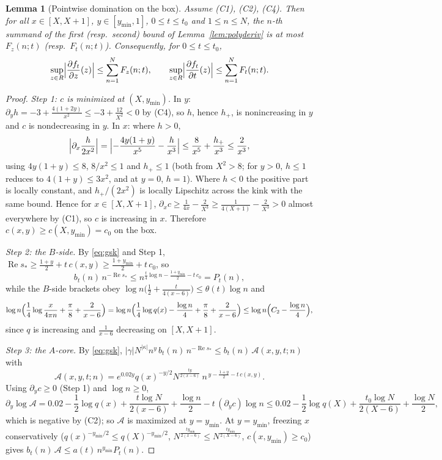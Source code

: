 \documentclass[11pt]{article}
\newtheorem{lemma}[theorem]{Lemma}
\theoremstyle{definition}
\DeclareMathOperator{\Rea}{Re}
\begin{document}
\begin{lemma}[Pointwise domination on the box]\label{lem:dompoint}
Assume (C1), (C2), (C4). Then for all $x\in[X,X+1]$,
$y\in[y_{\min},1]$, $0\le t\le t_0$ and $1\le n\le N$, the $n$-th
summand of the first (resp.\ second) bound of
Lemma~\ref{lem:polyderiv} is at most $F_z(n;t)$ (resp.\
$F_t(n;t)$). Consequently, for $0\le t\le t_0$,
\[
\sup_{z\in R}\Bigl|\frac{\partial f_t}{\partial z}(z)\Bigr|
\le\sum_{n=1}^{N}F_z(n;t),
\qquad
\sup_{z\in R}\Bigl|\frac{\partial f_t}{\partial t}(z)\Bigr|
\le\sum_{n=1}^{N}F_t(n;t).
\]
\end{lemma}

\begin{proof}
\emph{Step 1: $c$ is minimized at $(X,y_{\min})$.} In $y$:
$\partial_yh=-3+\frac{4(1+2y)}{x^2}\le-3+\frac{12}{X^2}<0$ by (C4),
so $h$, hence $h_+$, is nonincreasing in $y$ and $c$ is
nondecreasing in $y$. In $x$: where $h>0$,
\[
\Bigl|\partial_x\frac{h}{2x^2}\Bigr|
=\Bigl|-\frac{4y(1+y)}{x^5}-\frac{h}{x^3}\Bigr|
\le\frac{8}{x^5}+\frac{h_+}{x^3}\le\frac2{x^3},
\]
using $4y(1+y)\le8$, $8/x^2\le1$ and $h_+\le1$ (both from
$X^2>8$; for $y>0$, $h\le1$ reduces to $4(1+y)\le3x^2$, and at
$y=0$, $h=1$). Where $h<0$ the positive part is locally constant,
and $h_+/(2x^2)$ is locally Lipschitz across the kink with the same
bound. Hence for $x\in[X,X+1]$,
$\partial_xc\ge\frac1{4x}-\frac2{X^3}
\ge\frac1{4(X+1)}-\frac2{X^3}>0$ almost everywhere by (C1), so $c$
is increasing in $x$. Therefore $c(x,y)\ge c(X,y_{\min})=c_0$ on
the box.

\emph{Step 2: the $B$-side.} By \eqref{eq:gsk} and Step 1,
$\Rea s_*\ge\frac{1+y}2+t\,c(x,y)\ge\frac{1+y_{\min}}2+t\,c_0$, so
\[
b_t(n)\,n^{-\Rea s_*}
\le n^{\frac t4\log n-\frac{1+y_{\min}}2-t\,c_0}=P_t(n),
\]
while the $B$-side brackets obey
$\log n\bigl(\frac12+\frac t{4(x-6)}\bigr)\le\theta(t)\log n$ and
\[
\log n\Bigl(\frac14\log\frac x{4\pi n}+\frac\pi8+\frac2{x-6}\Bigr)
=\log n\Bigl(\frac14\log q(x)-\frac{\log n}4+\frac\pi8
+\frac2{x-6}\Bigr)
\le\log n\Bigl(C_2-\frac{\log n}4\Bigr),
\]
since $q$ is increasing and $\frac1{x-6}$ decreasing on $[X,X+1]$.

\emph{Step 3: the $A$-core.} By \eqref{eq:gsk},
$|\gamma|N^{|\kappa|}n^y\,b_t(n)\,n^{-\Rea s_*}\le
b_t(n)\,\mathcal A(x,y,t;n)$ with
\[
\mathcal A(x,y,t;n)
=e^{0.02y}q(x)^{-y/2}N^{\frac{ty}{2(x-6)}}\,
n^{\,y-\frac{1+y}2-t\,c(x,y)} .
\]
Using $\partial_yc\ge0$ (Step 1) and $\log n\ge0$,
\[
\partial_y\log\mathcal A
=0.02-\frac12\log q(x)+\frac{t\log N}{2(x-6)}
+\frac{\log n}2-t\,(\partial_yc)\log n
\le0.02-\frac12\log q(X)+\frac{t_0\log N}{2(X-6)}+\frac{\log N}2,
\]
which is negative by (C2); so $\mathcal A$ is maximized at
$y=y_{\min}$. At $y=y_{\min}$, freezing $x$ conservatively
($q(x)^{-y_{\min}/2}\le q(X)^{-y_{\min}/2}$,
$N^{\frac{ty_{\min}}{2(x-6)}}\le N^{\frac{ty_{\min}}{2(X-6)}}$,
$c(x,y_{\min})\ge c_0$) gives
$b_t(n)\,\mathcal A\le a(t)\,n^{y_{\min}}P_t(n)$.


\end{proof}
\end{document}
